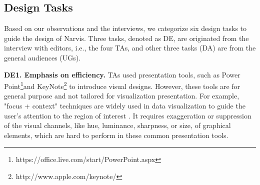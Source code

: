 \subsection{Design Tasks}
Based on our observations and the interviews, we categorize six design tasks to guide the design of Narvis. Three tasks, denoted as DE, are originated from the interview with editors, i.e., the four TAs, and other three tasks (DA) are from the general audiences (UGs).

\noindent
\textbf{DE1. Emphasis on  efficiency.}
TAs used presentation tools, such as Power Point\footnote{https://office.live.com/start/PowerPoint.aspx}and KeyNote\footnote{http://www.apple.com/keynote/} to introduce visual designs. However, these tools are for general purpose and not tailored for visualization presentation. 
For example, "focus + context" techniques are widely used in data visualization to guide the user’s attention to the region of interest \cite{doleisch2003interactive, kosara2002focus+}. It requires exaggeration or suppression of the visual channels, like hue, luminance, sharpness, or size, of graphical elements, which are hard to perform in these common presentation tools. 

